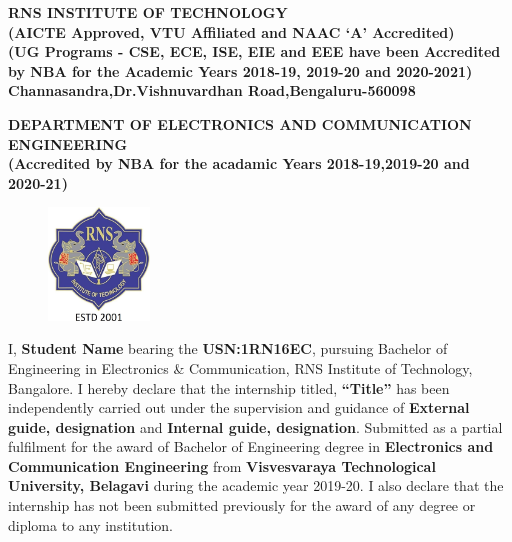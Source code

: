 %
\setlength{\toptafiddle}{1in}
\setlength{\bottafiddle}{1in}
\vspace*{-0.5in}
\enlargethispage{\bottafiddle}
\thispagestyle{empty}


\begin{center}
\small\textbf{\color{blue}	RNS INSTITUTE OF TECHNOLOGY\\
(AICTE Approved, VTU Affiliated and NAAC `A' Accredited)\\
(UG Programs - CSE, ECE, ISE, EIE and EEE have been Accredited by NBA for the Academic Years 2018-19, 2019-20 and 2020-2021)\\
Channasandra,Dr.Vishnuvardhan Road,Bengaluru-560098}\\
\vspace{0.3cm}

\small\textbf{DEPARTMENT OF ELECTRONICS AND COMMUNICATION ENGINEERING\\
(Accredited by NBA for the acadamic Years 2018-19,2019-20 and 2020-21)
}
\end{center}

\begin{center}
\begin{figure}[h]
\centering
\includegraphics[height=3cm]{images/rns1.jpg}
\end{figure}
\Large{\textbf{\color{red}{DECLARATION}}}
\end{center}

I, \textbf{Student Name} bearing the \textbf{USN:1RN16EC}, pursuing Bachelor of\\ Engineering in Electronics \& Communication, RNS Institute of Technology, Bangalore. I hereby declare that the internship titled, \textbf{“Title”} has been independently carried out under the supervision and guidance of \textbf{External guide, designation} and \textbf{Internal guide, designation}. Submitted as a partial fulfilment for the award of Bachelor of Engineering degree in \textbf{\color{blue}Electronics and Communication Engineering} from \textbf{\color{blue}Visvesvaraya Technological University, Belagavi} during the academic year 2019-20. I also declare that the internship has not been submitted previously for the award of any degree or diploma to any institution.


